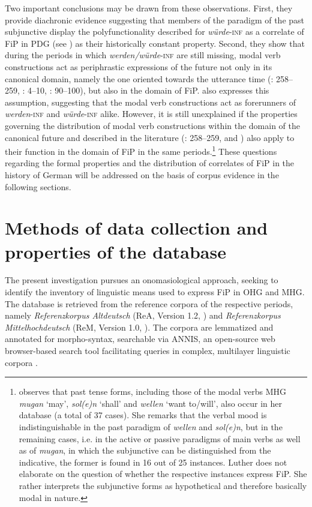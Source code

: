 \documentclass[output=paper,colorlinks,citecolor=brown]{langscibook}
\begin{document}
Two important conclusions may be drawn from these observations. First, they provide diachronic evidence suggesting that members of the paradigm of the past subjunctive display the polyfunctionality described for \textit{würde}-\textsc{inf} as a correlate of FiP in PDG (see ) as their historically constant property. Second, they show that during the periods in which \textit{werden/würde}-\textsc{inf} are still missing, modal verb constructions act as periphrastic expressions of the future not only in its canonical domain, namely the one oriented towards the utterance time (\cite{Behaghel1924}: 258–259, \cite{Luther2012}: 4–10, \cite{Luther2013}: 90–100), but also in the domain of FiP. \citet[190]{Szatzker2003} also expresses this assumption, suggesting that the modal verb constructions act as forerunners of \textit{werden}-\textsc{inf} and \textit{würde}-\textsc{inf} alike. However, it is still unexplained if the properties governing the distribution of modal verb constructions within the domain of the canonical future and described in the literature (\cite{Behaghel1924}: 258–259, \cite{Luther2012} and \citeyear{Luther2013}) also apply to their function in the domain of FiP in the same periods.\footnote{\citet[104]{Luther2013} observes that past tense forms, including those of the modal verbs MHG \textit{mugan} ‘may’, \textit{sol(e)n} ‘shall’ and \textit{wellen} ‘want to/will’, also occur in her database (a total of 37 cases). She remarks that the verbal mood is indistinguishable in the past paradigm of \textit{wellen} and \textit{sol(e)n}, but in the remaining cases, i.e. in the active or passive paradigms of main verbs as well as of \textit{mugan}, in which the subjunctive can be distinguished from the indicative, the former is found in 16 out of 25 instances. Luther does not elaborate on the question of whether the respective instances express FiP. She rather interprets the subjunctive forms as hypothetical and therefore basically modal in nature.} These questions regarding the formal properties and the distribution of correlates of FiP in the history of German will be addressed on the basis of corpus evidence in the following sections.


\section{Methods of data collection and properties of the database} \label{section 3}

The present investigation pursues an onomasiological approach, seeking to identify the inventory of linguistic means used to express FiP in OHG and MHG. The database is retrieved from the reference corpora of the respective periods, namely \textit{Referenzkorpus Altdeutsch} (ReA, Version 1.2, \cite{zeigeDeutschDiachronDigital2022}) and \textit{Referenzkorpus Mittelhochdeutsch} (ReM, Version 1.0, \cite{kleinReferenzkorpusMittelhochdeutsch105013502016}). The corpora are lemmatized and annotated for morpho-syntax, searchable via ANNIS, an open-source web browser-based search tool facilitating queries in complex, multilayer linguistic corpora \citep{KrauseZeldes2016}.
\end{document}
